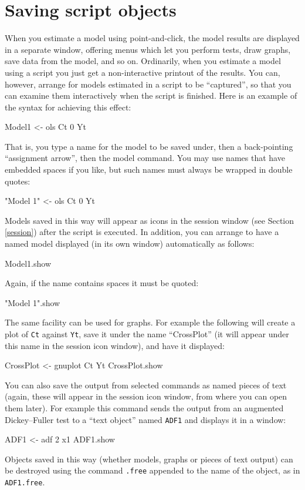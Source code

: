 \section{Saving script objects}
\label{sect-script-objects}

When you estimate a model using point-and-click, the model results are
displayed in a separate window, offering menus which let you perform
tests, draw graphs, save data from the model, and so on.  Ordinarily,
when you estimate a model using a script you just get a
non-interactive printout of the results.  You can, however, arrange
for models estimated in a script to be ``captured'', so that you can
examine them interactively when the script is finished.  Here is an
example of the syntax for achieving this effect:
    
\begin{code}
      Model1 <- ols Ct 0 Yt
\end{code}
That is, you type a name for the model to be saved under, then a
back-pointing ``assignment arrow'', then the model command.  You may
use names that have embedded spaces if you like, but such names must
always be wrapped in double quotes:
\begin{code}
      "Model 1" <- ols Ct 0 Yt
\end{code}
Models saved in this way will appear as icons in the 
session window (see Section \ref{session}) after the script is
executed.  In addition, you can arrange to have a named model
displayed (in its own window) automatically as follows:
\begin{code}
      Model1.show
\end{code}
Again, if the name contains spaces it must be quoted:
\begin{code}
      "Model 1".show
\end{code}
The same facility can be used for graphs.  For example the following
will create a plot of \verb+Ct+ against \verb+Yt+, save it under the
name ``CrossPlot'' (it will appear under this name in the session icon
window), and have it displayed:
\begin{code}
      CrossPlot <- gnuplot Ct Yt
      CrossPlot.show
\end{code}
You can also save the output from selected commands as named pieces of
text (again, these will appear in the session icon window, from where
you can open them later).  For example this command sends the output
from an augmented Dickey--Fuller test to a ``text object'' named
\verb+ADF1+ and displays it in a window:
\begin{code}
      ADF1 <- adf 2 x1
      ADF1.show
\end{code}
Objects saved in this way (whether models, graphs or pieces of text
output) can be destroyed using the command \verb+.free+ appended to
the name of the object, as in \verb+ADF1.free+.

